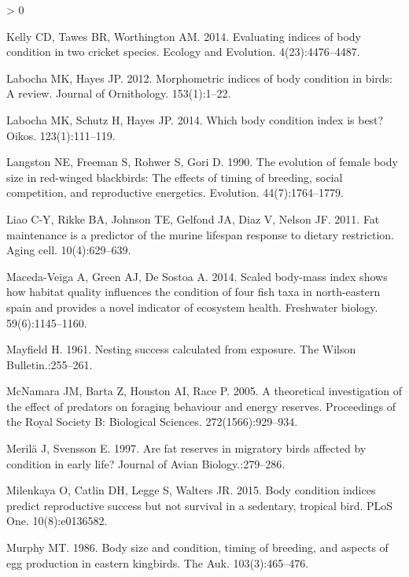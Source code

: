 \documentclass[
]{article}
\newlength{\cslhangindent}
\newenvironment{CSLReferences}[2] %
 {%
  \setlength{\parindent}{0pt}
  \ifodd #1 \everypar{\setlength{\hangindent}{\cslhangindent}}\ignorespaces\fi
  \ifnum #2 > 0
  \setlength{\parskip}{#2\baselineskip}
  \fi
 }%
 {}
\begin{document}
\begin{CSLReferences}{0}{0}
\leavevmode\hypertarget{ref-kelly2014evaluating}{}%
Kelly CD, Tawes BR, Worthington AM. 2014. Evaluating indices of body
condition in two cricket species. Ecology and Evolution.
4(23):4476--4487.

\leavevmode\hypertarget{ref-labocha2012morphometric}{}%
Labocha MK, Hayes JP. 2012. Morphometric indices of body condition in
birds: A review. Journal of Ornithology. 153(1):1--22.

\leavevmode\hypertarget{ref-labocha2014body}{}%
Labocha MK, Schutz H, Hayes JP. 2014. Which body condition index is
best? Oikos. 123(1):111--119.

\leavevmode\hypertarget{ref-langston1990evolution}{}%
Langston NE, Freeman S, Rohwer S, Gori D. 1990. The evolution of female
body size in red-winged blackbirds: The effects of timing of breeding,
social competition, and reproductive energetics. Evolution.
44(7):1764--1779.

\leavevmode\hypertarget{ref-liao2011fat}{}%
Liao C-Y, Rikke BA, Johnson TE, Gelfond JA, Diaz V, Nelson JF. 2011. Fat
maintenance is a predictor of the murine lifespan response to dietary
restriction. Aging cell. 10(4):629--639.

\leavevmode\hypertarget{ref-maceda2014scaled}{}%
Maceda-Veiga A, Green AJ, De Sostoa A. 2014. Scaled body-mass index
shows how habitat quality influences the condition of four fish taxa in
north-eastern spain and provides a novel indicator of ecosystem health.
Freshwater biology. 59(6):1145--1160.

\leavevmode\hypertarget{ref-mayfield1961nesting}{}%
Mayfield H. 1961. Nesting success calculated from exposure. The Wilson
Bulletin.:255--261.

\leavevmode\hypertarget{ref-mcnamara2005theoretical}{}%
McNamara JM, Barta Z, Houston AI, Race P. 2005. A theoretical
investigation of the effect of predators on foraging behaviour and
energy reserves. Proceedings of the Royal Society B: Biological
Sciences. 272(1566):929--934.

\leavevmode\hypertarget{ref-merila1997fat}{}%
Merilä J, Svensson E. 1997. Are fat reserves in migratory birds affected
by condition in early life? Journal of Avian Biology.:279--286.

\leavevmode\hypertarget{ref-milenkaya2015body}{}%
Milenkaya O, Catlin DH, Legge S, Walters JR. 2015. Body condition
indices predict reproductive success but not survival in a sedentary,
tropical bird. PLoS One. 10(8):e0136582.

\leavevmode\hypertarget{ref-murphy1986body}{}%
Murphy MT. 1986. Body size and condition, timing of breeding, and
aspects of egg production in eastern kingbirds. The Auk.
103(3):465--476.


\end{CSLReferences}
\end{document}

